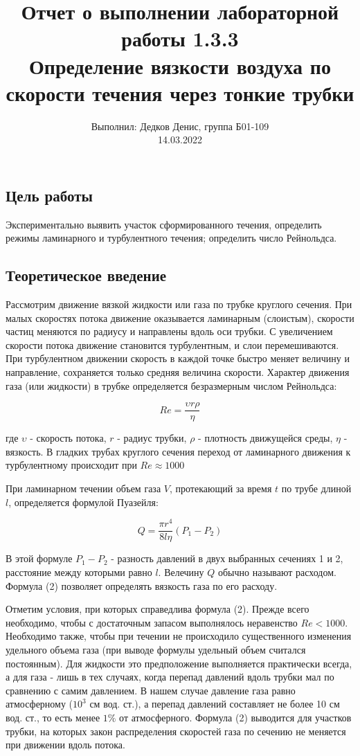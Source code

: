 \documentclass[12pt,a4paper]{article}
\author{\normalsize Выполнил: Дедков Денис, группа Б01-109 \\
	\normalsize 14.03.2022}
\date{}
\title
{
	\large Отчет о выполнении лабораторной работы 1.3.3 \\
	\Large Определение вязкости воздуха по скорости течения через тонкие трубки \\ 
}
\begin{document}
	\maketitle
	
	\subsection*{Цель работы} Экспериментально выявить участок сформированного течения, определить режимы ламинарного и турбулентного течения; определить число Рейнольдса.
	
	\subsection*{Теоретическое введение}
	Рассмотрим движение вязкой жидкости или газа по трубке круглого сечения. При малых скоростях потока движение оказывается ламинарным (слоистым), скорости частиц меняются по радиусу и направлены вдоль оси трубки. С увеличением скорости потока движение становится турбулентным, и слои перемешиваются. При турбулентном движении скорость в каждой точке быстро меняет величину и направление, сохраняется только средняя величина скорости.
	Характер движения газа (или жидкости) в трубке определяется безразмерным числом Рейнольдса:
	
	\begin{equation}
		Re = \dfrac{\upsilon r \rho}{\eta}
	\end{equation}
	
	где $\upsilon$ - скорость потока, $r$ - радиус трубки, $\rho$ - плотность движущейся среды, $\eta$ - вязкость. В гладких трубах круглого сечения переход от ламинарного движения к турбулентному происходит при $Re \approx 1000$
	
	При ламинарном течении объем газа $V$, протекающий за время $t$ по трубе длиной $l$, определяется формулой Пуазейля:
	
	\begin{equation} \label{form:QP}
		Q = \dfrac{\pi r^4}{8 l \eta}(P_1 - P_2)
	\end{equation}

	В этой формуле $P_1 - P_2$ - разность давлений в двух выбранных сечениях 1 и 2, расстояние между которыми равно $l$. Велечину $Q$ обычно называют расходом. Формула (2) позволяет определять вязкость газа по его расходу.
	
	Отметим условия, при которых справедлива формула (2). Прежде всего необходимо, чтобы с достаточным запасом выполнялось неравенство $Re < 1000$. Необходимо также, чтобы при течении не происходило существенного изменения удельного объема газа (при выводе формулы удельный объем считался постоянным). Для жидкости это предположение выполняется практически всегда, а для газа - лишь в тех случаях, когда перепад давлений вдоль трубки мал по сравнению с самим давлением. В нашем случае давление газа равно атмосферному ($10^3$ см вод. ст.), а перепад давлений составляет не более 10 см вод. ст., то есть менее $1\%$ от атмосферного. Формула (2) выводится для участков трубки, на которых закон распределения скоростей газа по сечению не меняется при движении вдоль потока.
	
\end{document}
